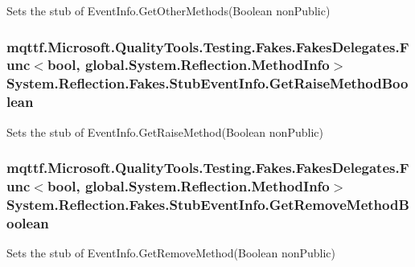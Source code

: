 Sets the stub of Event\-Info.\-Get\-Other\-Methods(\-Boolean non\-Public)

\hypertarget{class_system_1_1_reflection_1_1_fakes_1_1_stub_event_info_a3c663627dd4e63f0e3d8ac7debdeb3f9}{
\subsubsection[{Get\-Raise\-Method\-Boolean}]{\setlength{\rightskip}{0pt plus 5cm}mqttf.\-Microsoft.\-Quality\-Tools.\-Testing.\-Fakes.\-Fakes\-Delegates.\-Func$<$bool, global.\-System.\-Reflection.\-Method\-Info$>$ System.\-Reflection.\-Fakes.\-Stub\-Event\-Info.\-Get\-Raise\-Method\-Boolean}}\label{class_system_1_1_reflection_1_1_fakes_1_1_stub_event_info_a3c663627dd4e63f0e3d8ac7debdeb3f9}


Sets the stub of Event\-Info.\-Get\-Raise\-Method(\-Boolean non\-Public)

\hypertarget{class_system_1_1_reflection_1_1_fakes_1_1_stub_event_info_a7766593b97bb7ad07f46929425e5463c}{
\subsubsection[{Get\-Remove\-Method\-Boolean}]{\setlength{\rightskip}{0pt plus 5cm}mqttf.\-Microsoft.\-Quality\-Tools.\-Testing.\-Fakes.\-Fakes\-Delegates.\-Func$<$bool, global.\-System.\-Reflection.\-Method\-Info$>$ System.\-Reflection.\-Fakes.\-Stub\-Event\-Info.\-Get\-Remove\-Method\-Boolean}}\label{class_system_1_1_reflection_1_1_fakes_1_1_stub_event_info_a7766593b97bb7ad07f46929425e5463c}


Sets the stub of Event\-Info.\-Get\-Remove\-Method(\-Boolean non\-Public)

